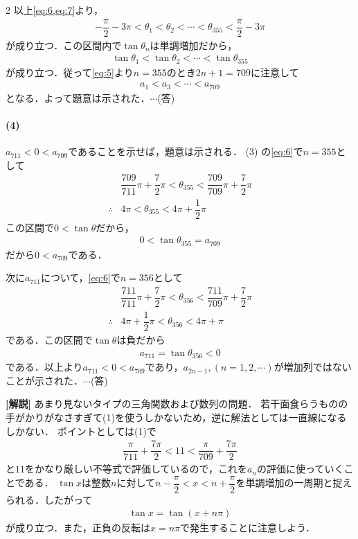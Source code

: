 \documentclass[../../main.tex]{subfiles}
\begin{document}
\begin{multicols}{2}
  以上\cref{eq:6,eq:7}より，
  \begin{align}
    -\dfrac{\pi}{2}-3\pi < \theta_1 < \theta_2 < \cdots < \theta_{355} < \dfrac{\pi}{2}-3\pi
  \end{align}
  が成り立つ．この区間内で$\tan\theta_n$は単調増加だから，
  \begin{align}
    \tan \theta_1 < \tan \theta_2 < \cdots < \tan \theta_{355}
  \end{align}
  が成り立つ．従って\cref{eq:5}より$n=355$のとき$2n+1=709$に注意して
  \begin{align}
    a_1 < a_3 < \cdots < a_{709}
  \end{align}
  となる．よって題意は示された．$\cdots$(答)

  \paragraph{(4)}

  $a_{711}<0<a_{709}$であることを示せば，題意は示される．
  (3) の\cref{eq:6}で$n=355$として
  \begin{align}
    & \dfrac{709}{711}\pi + \dfrac{7}{2}\pi < \theta_{355} < \dfrac{709}{709}\pi + \dfrac{7}{2}\pi \\
    \therefore
    & 4\pi < \theta_{355} < 4\pi + \dfrac{1}{2}\pi
  \end{align}
  この区間で$0<\tan\theta$だから，
  \begin{align}
    0 < \tan\theta_{355} = a_{709}
  \end{align}
  だから$0<a_{709}$である．

  次に$a_{711}$について，\cref{eq:6}で$n=356$として
  \begin{align}
    & \dfrac{711}{711}\pi + \dfrac{7}{2}\pi < \theta_{356} < \dfrac{711}{709}\pi + \dfrac{7}{2}\pi \\
    \therefore
    & 4\pi + \dfrac{1}{2}\pi < \theta_{356} < 4\pi + \pi
  \end{align}
  である．この区間で$\tan\theta$は負だから
  \begin{align}
    a_{711} = \tan\theta_{356} < 0
  \end{align}
  である．以上より$a_{711}<0<a_{709}$であり，$a_{2n-1}, (n=1,2,\cdots)$が増加列ではないことが示された．$\cdots$(答)

  {\bf [解説]}
  あまり見ないタイプの三角関数および数列の問題．
  若干面食らうものの手がかりがなさすぎて(1)を使うしかないため，逆に解法としては一直線になるしかない．
  ポイントとしては(1)で
  \begin{align}
    \dfrac{\pi}{711} + \dfrac{7\pi}{2} < 11 < \dfrac{\pi}{709} + \dfrac{7\pi}{2}
  \end{align}
  と$11$をかなり厳しい不等式で評価しているので，これを$a_n$の評価に使っていくことである．
  $\tan x$は整数$n$に対して$n-\dfrac{\pi}{2}<x<n+\dfrac{\pi}{2}$を単調増加の一周期と捉えられる．したがって
  \begin{align}
    \tan x = \tan (x+n\pi)
  \end{align}
  が成り立つ．また，正負の反転は$x=n\pi$で発生することに注意しよう．


\end{multicols}
\end{document}
